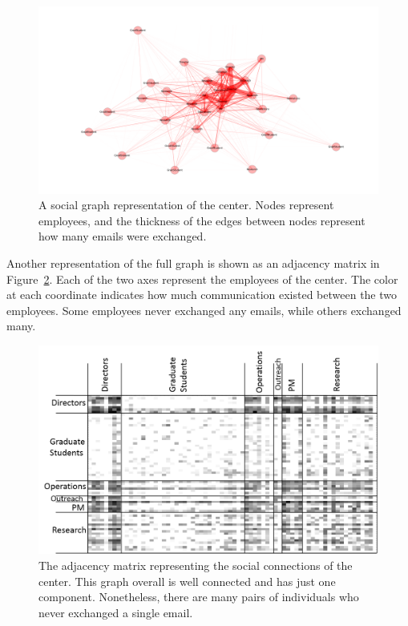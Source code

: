 \documentclass[12pt]{report}
\begin{document}
\begin{figure}[t]
    \centering
    \includegraphics[width=\columnwidth,trim={4mm .5mm 0mm 5mm},clip]{HumeGraph2}
    \vspace{-17pt}
    \caption[The social network of the center]{A social graph representation of the center.  Nodes represent employees, and the thickness of the edges between nodes represent how many emails were exchanged.}
    \label{fig:social_net}
\end{figure}

Another representation of the full graph is shown as an adjacency matrix in Figure~\ref{fig:adj_matrix}.
Each of the two axes represent the employees of the center.
The color at each coordinate indicates how much communication existed between the two employees.
Some employees never exchanged any emails, while others exchanged many.

\begin{figure}[t]
    \centering
    \includegraphics[width=\columnwidth,trim={4mm .5mm 0mm 5mm},clip]{adj_matrix}
    \vspace{-17pt}
    \caption[The dataset represented as an adjacency matrix]{The adjacency matrix representing the social connections of the center.  This graph overall is well connected and has just one component.  Nonetheless, there are many pairs of individuals who never exchanged a single email.}
    \label{fig:adj_matrix}
\end{figure}
\end{document}
